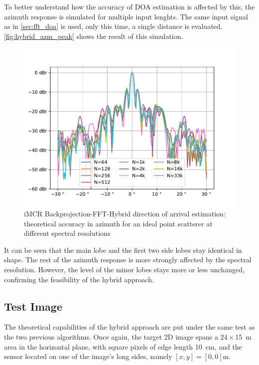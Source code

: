 To better understand how the accuracy of DOA estimation is affected by this,
the azimuth response is simulated for multiple input lenghts.
The same input signal as in \autoref{sec:fft_doa} is used, only this time, a single distance is evaluated.
\autoref{fig:hybrid_azm_peak} shows the result of this simulation.
\begin{figure}[h]
    \centering
    \includegraphics[width=\textwidth]{../figures/hybrid_azm_peak.pdf}
    \caption{iMCR Backprojection-FFT-Hybrid direction of arrival estimation: 
    theoretical accuracy in azimuth for an ideal point scatterer at different spectral resolutions}
    \label{fig:hybrid_azm_peak}
\end{figure}

It can be seen that the main lobe and the first two side lobes stay identical in shape.
The rest of the azimuth response is more strongly affected by the spectral resolution.
However, the level of the minor lobes stays more or less unchanged,
confirming the feasibility of the hybrid approach.

\subsection{Test Image}
The theoretical capabilities of the hybrid approach are put under the same test as the two previous algorithms.
Once again, the target 2D image spans a $24 \times$\SI{15}{\m} area in the horizontal plane,
with square pixels of edge length \SI{10}{\cm},
and the sensor located on one of the image's long sides, namely $[x,y] = [0,0]$m.

